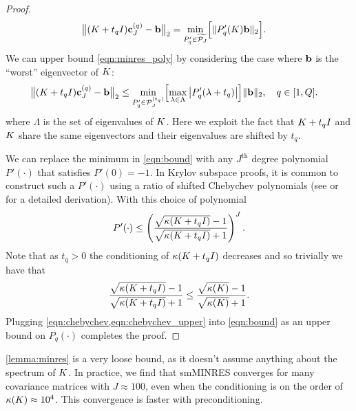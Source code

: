 \begin{proof}
\begin{align}
    \bigl\Vert (K + t_q I) \mathbf{c}_J^{(q)} - \mathbf{b} \bigr\Vert_2
    &= \min_{P'_q \in \widetilde{\mathcal{P}_J}} \Bigl[
      \Vert P'_q(K) \mathbf{b} \Vert_2
    \Bigr].
    \label{eqn:minres_poly}
  \end{align}
  We can upper bound \cref{eqn:minres_poly} by considering the case where $\mathbf{b}$ is the ``worst'' eigenvector of $K$:
  \begin{align}
    \bigl\Vert (K + t_q I) \mathbf{c}_J^{(q)} - \mathbf{b} \bigr\Vert_2
    &\leq \min_{P'_q \in \mathcal{P}^{(t_q)}_J} \Bigl[
      \max_{\lambda \in \Lambda}
      \left\vert P'_q(\lambda + t_q) \right\vert
    \Bigr] \Vert \mathbf{b} \Vert_2,
    \quad
    q \in [1, Q].
    \label{eqn:bound}
	\end{align}
  where $\Lambda$ is the set of eigenvalues of $K$.
  Here we exploit the fact that $K + t_q I$ and $K$ share the same eigenvectors and their eigenvalues are shifted by $t_q$.

  We can replace the minimum in \cref{eqn:bound} with any $J^\text{th}$ degree polynomial $P'(\cdot)$ that satisfies $P'(0) = -1$.
  In Krylov subspace proofs, it is common to construct such a $P'(\cdot)$ using a ratio of shifted Chebychev polynomials (see \citep[e.g.][Sec. 9.2]{shewchuk1994introduction} or \citep[e.g.][Thm. 38.5]{trefethen1997numerical} for a detailed derivation).
  With this choice of polynomial
  \begin{equation}
    P'(\cdot)
    \leq \left( \frac{
      \sqrt{\kappa(K + t_q I)} - 1
    }{
      \sqrt{\kappa(K + t_q I)} + 1
    }\right)^J.
    \label{eqn:chebychev}
  \end{equation}
  Note that as $t_q > 0$ the conditioning of $\kappa(K + t_q I)$ decreases and so trivially we have that
  \begin{equation}
    \frac{
      \sqrt{\kappa(K + t_q I)} - 1
    }{
      \sqrt{\kappa(K + t_q I)} + 1
    }
    \leq
    \frac{
      \sqrt{\kappa(K)} - 1
    }{
      \sqrt{\kappa(K)} + 1
    }.
    \label{eqn:chebychev_upper}
  \end{equation}
  Plugging \cref{eqn:chebychev,eqn:chebychev_upper} into \cref{eqn:bound} as an upper bound on $P_q(\cdot)$ completes the proof.
\end{proof}

\cref{lemma:minres} is a very loose bound, as it doesn't assume anything about the spectrum of $K$.
In practice, we find that smMINRES converges for many covariance matrices with $J \approx 100$, even when the conditioning is on the order of $\kappa(K) \approx 10^4$.
This convergence is faster with preconditioning.




